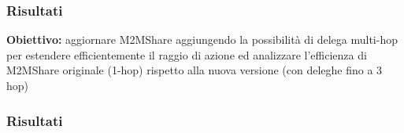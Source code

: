 \documentclass{beamer}
\begin{document}
\begin{frame}
\frametitle{Risultati}
\label{descrizione multi hop}
\textbf{Obiettivo:} aggiornare M2MShare aggiungendo la possibilità di delega multi-hop per estendere efficientemente il raggio di azione ed analizzare l’efficienza di M2MShare originale (1-hop) rispetto alla nuova versione  (con deleghe fino a 3 hop)
\end{frame}

\begin{frame}
\frametitle{Risultati}
\label{mappa multi hop}
\begin{figure}[htbp]
\centering%
\vspace{-30pt}%
\qquad
\vspace{-10pt}%
\pause
{}\qquad

\end{figure}
\end{frame}
\end{document}
